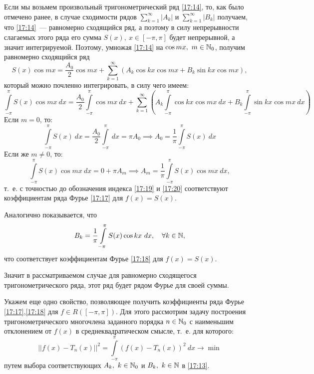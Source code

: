 \documentclass[../../main.tex]{subfiles}
\begin{document}
Если мы возьмем произвольный 
тригонометрический ряд \eqref{17:14}, то, как было отмечено ранее, в случае 
сходимости рядов
$\sum\limits_{k=1}^{\infty} \left| A_k \right|$ и $\sum\limits_{k=1}^{\infty} 
\left| B_k \right|$ получаем, что
\eqref{17:14}~--- равномерно сходящийся ряд, а поэтому в силу непрерывности 
слагаемых этого ряда его сумма $S(x),\ x\in\left[ -\pi,\pi \right] $ будет 
непрерывной, а значит интегрируемой.
Поэтому, умножая \eqref{17:14} на $\cos{mx},\ m \in \mathbb{N}_0$, получим равномерно 
сходящийся ряд
\[  S(x) \cos{mx} =  \frac{A_0}{2} \cos{mx} + \sum_{k=1}^{\infty}  \left( A_k 
\cos{kx} \cos{mx} + B_k \sin{kx} \cos{mx} \right), \]
который можно почленно интегрировать, в силу чего имеем:
\[  \int\limits_{-\pi}^{\pi} S(x) \cos{mx} \ dx = 
\frac{A_0}{2}\int\limits_{-\pi}^{\pi} \cos{mx} \ dx + \sum_{k=1}^{\infty}  
\left( A_k \int\limits_{-\pi}^{\pi} \cos{kx} \cos{mx} \ dx + B_k 
\int\limits_{-\pi}^{\pi} \sin{kx} \cos{mx} \ dx \right)  \]
Если $m=0$, то:
\begin{equation}
\label{17:19}
\int\limits_{-\pi}^{\pi} S(x) \ dx = \frac{A_0}{2}\int\limits_{-\pi}^{\pi} \ 
dx  = \pi A_0  \implies A_0 = \frac{1}{\pi} \int\limits_{-\pi}^{\pi} S(x) \ dx
\end{equation}
Если же $m \ne 0$, то:
\begin{equation}
\label{17:20}
\int\limits_{-\pi}^{\pi} S(x) \cos{mx} \ dx = 0 + \pi A_m \implies A_m = 
\frac{1}{\pi} \int\limits_{-\pi}^{\pi} S(x) \cos{mx} \ dx,
\end{equation}
т.~е. с точностью до обозначения индекса \eqref{17:19} и \eqref{17:20} 
соответствуют коэффициентам ряда Фурье \eqref{17:17} для $f(x) = S(x)$.

Аналогично показывается, что
\begin{equation}
\label{17:21}
B_k = \frac{1}{\pi} \int\limits_{-\pi}^{\pi} S(x) \cos{kx} \ dx, \quad 
\forall k \in \mathbb{N},
\end{equation}
что соответствует коэффициентам Фурье \eqref{17:18} для $f(x) = S(x)$. 

Значит в рассматриваемом случае для равномерно сходящегося тригонометрического 
ряда, этот ряд будет рядом Фурье для своей суммы.

Укажем еще одно свойство, позволяющее получить коэффициенты ряда Фурье 
\eqref{17:17},\eqref{17:18} для $f \in R\left( \left[ -\pi,\pi\right]  
\right).$ Для этого рассмотрим задачу построения тригонометрического 
многочлена заданного порядка $n \in \mathbb{N}_0$ с наименьшим отклонением от $f(x)$ в 
среднеквадратическом смысле, т.~е. для которого:
\begin{equation}
\label{17:22}
\left|| f(x) -T_n(x) |\right| ^2 = \int \limits_{-\pi}^{\pi} \left( f(x) - 
T_n(x)\right)^2 \ dx \to \min
\end{equation}
путем выбора соответствующих $A_k,\ k \in \mathbb{N}_0$ и $B_k,\ k \in \mathbb{N}$ в 
\eqref{17:13}.
\end{document}

